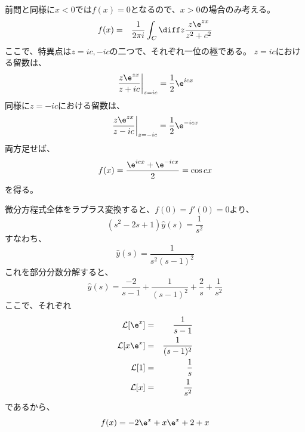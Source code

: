前問と同様に$x<0$では$f(x) = 0$となるので、$x>0$の場合のみ考える。
\begin{eqnarray}
  f(x) &=& \frac{1}{2 \pi i} \int_C \diff z \frac{z \e^{zx}}{z^2+c^2}
\end{eqnarray}
ここで、特異点は$z = ic, -ic$の二つで、それぞれ一位の極である。
$z = ic$における留数は、
\begin{equation}
  \left. \frac{z \e^{zx}}{z+ic} \right|_{z = ic} = \frac{1}{2}\e^{icx}
\end{equation}
同様に$z = -ic$における留数は、
\begin{equation}
  \left. \frac{z \e^{zx}}{z-ic} \right|_{z = -ic} = \frac{1}{2}\e^{-icx}
\end{equation}
両方足せば、
\begin{equation}
  f(x) = \frac{\e^{icx}+\e^{-icx}}{2} = \cos cx
\end{equation}
を得る。

微分方程式全体をラプラス変換すると、$f(0)=f'(0)=0$より、
\begin{equation}
  (s^2 - 2s +1) \hat{y}(s) = \frac{1}{s^2}
\end{equation}
すなわち、
\begin{equation}
  \hat{y}(s) = \frac{1}{s^2 (s-1)^2}
\end{equation}
これを部分分数分解すると、
\begin{equation}
  \hat{y}(s) = \frac{-2}{s-1} + \frac{1}{(s-1)^2} + \frac{2}{s} + \frac{1}{s^2}
\end{equation}
ここで、それぞれ
\begin{eqnarray}
  {\cal L}[\e^x] &=& \frac{1}{s-1}\\
  {\cal L}[x\e^x] &=& \frac{1}{(s-1)^2}\\
  {\cal L}[1] &=& \frac{1}{s}\\
  {\cal L}[x] &=& \frac{1}{s^2}
\end{eqnarray}
であるから、
\begin{equation}
  f(x) = -2 \e^{x}+x\e^x+2+x
\end{equation}

